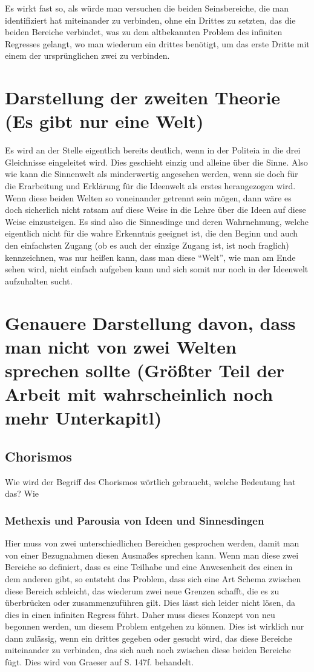 \documentclass[12pt]{article}
\begin{document}
Es  wirkt fast so, als würde man versuchen die beiden Seinsbereiche, die man identifiziert hat miteinander zu verbinden, ohne ein Drittes zu setzten, das die beiden Bereiche verbindet, was zu dem altbekannten Problem des infiniten Regresses gelangt, wo man wiederum ein drittes benötigt, um das erste Dritte mit einem der ursprünglichen zwei zu verbinden.

\section{Darstellung der zweiten Theorie (Es gibt nur eine Welt)}
Es wird an der Stelle eigentlich bereits deutlich, wenn in der Politeia in die drei Gleichnisse eingeleitet wird. Dies geschieht einzig und alleine über die Sinne. Also wie kann die Sinnenwelt als minderwertig angesehen werden, wenn sie doch für die Erarbeitung und Erklärung für die Ideenwelt als erstes herangezogen wird.
Wenn diese beiden Welten so voneinander getrennt sein mögen, dann wäre es doch sicherlich nicht ratsam auf diese Weise in die Lehre über die Ideen auf diese Weise einzusteigen. Es sind also die Sinnesdinge und deren Wahrnehmung, welche eigentlich nicht für die wahre Erkenntnis geeignet ist, die den Beginn und auch den einfachsten Zugang (ob es auch der einzige Zugang ist, ist noch fraglich) kennzeichnen, was nur heißen kann, dass man diese \enquote{Welt}, wie man am Ende sehen wird, nicht einfach aufgeben kann und sich somit nur noch in der Ideenwelt aufzuhalten sucht.
\section{Genauere Darstellung davon, dass man nicht von zwei Welten sprechen sollte (Größter Teil der Arbeit mit wahrscheinlich noch mehr Unterkapitl)}
\subsection{Chorismos}
Wie wird der Begriff des Chorismos wörtlich gebraucht, welche Bedeutung hat das? Wie 


\subsubsection{Methexis und Parousia von Ideen und Sinnesdingen}
Hier muss von zwei unterschiedlichen Bereichen gesprochen werden, damit man von einer Bezugnahmen diesen Ausmaßes sprechen kann.
Wenn man diese zwei Bereiche so definiert, dass es eine Teilhabe und eine Anwesenheit des einen in dem anderen gibt, so entsteht das Problem, dass sich eine Art Schema zwischen diese Bereich schleicht, das wiederum zwei neue Grenzen schafft, die es zu überbrücken oder zusammenzuführen gilt. Dies lässt sich leider nicht lösen, da dies in einen infiniten Regress führt. Daher muss dieses Konzept von neu begonnen werden, um diesem Problem entgehen zu können. Dies ist wirklich nur dann zulässig, wenn ein drittes gegeben oder gesucht wird, das diese Bereiche miteinander zu verbinden, das sich auch noch zwischen diese beiden Bereiche fügt.
Dies wird von Graeser auf S. 147f. behandelt.  
\end{document}
